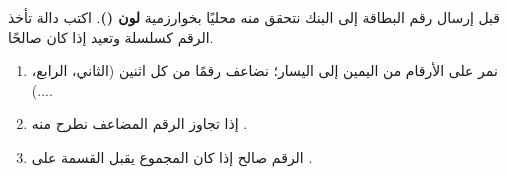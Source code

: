 \begin{statement}
قبل إرسال رقم البطاقة إلى البنك نتحقق منه محليًا بخوارزمية \textbf{لون ()}. اكتب دالة  تأخذ الرقم كسلسلة وتعيد  إذا كان صالحًا.
\end{statement}
\begin{stepsbox}\begin{enumerate}
\item نمر على الأرقام من اليمين إلى اليسار؛ نضاعف رقمًا من كل اثنين (الثاني، الرابع، ...).
\item إذا تجاوز الرقم المضاعف  نطرح منه .
\item الرقم صالح إذا كان المجموع يقبل القسمة على .
\end{enumerate}\end{stepsbox}
